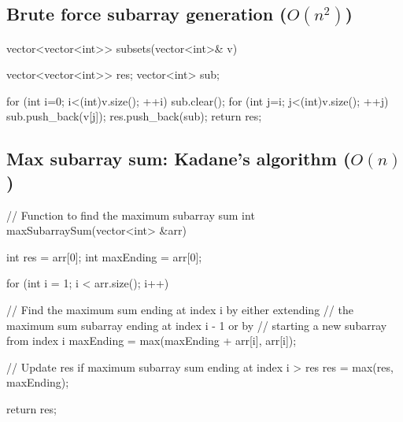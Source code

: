 \documentclass{report}
\begin{document}
\pagebreak 
{}
\bigbreak \noindent 
\subsection{Brute force subarray generation ($O(n^{2})$)}
\bigbreak \noindent 
\begin{cppcode}
    vector<vector<int>> subsets(vector<int>& v) {
        vector<vector<int>> res;
        vector<int> sub;

        for (int i=0; i<(int)v.size(); ++i) {
            sub.clear();
            for (int j=i; j<(int)v.size(); ++j) {
                sub.push_back(v[j]);
                res.push_back(sub);
            }
        }
        return res;
    }
\end{cppcode}
\bigbreak \noindent 
\subsection{Max subarray sum: Kadane's algorithm ($O(n)$)}
\bigbreak \noindent 
\begin{cppcode}
// Function to find the maximum subarray sum
int maxSubarraySum(vector<int> &arr) {
    int res = arr[0];
    int maxEnding = arr[0];

    for (int i = 1; i < arr.size(); i++) {
      
        // Find the maximum sum ending at index i by either extending 
        // the maximum sum subarray ending at index i - 1 or by
        // starting a new subarray from index i
        maxEnding = max(maxEnding + arr[i], arr[i]);
      
        // Update res if maximum subarray sum ending at index i > res
        res = max(res, maxEnding);
    }
    return res;
}
\end{cppcode}

\pagebreak 
{}
\bigbreak \noindent 










\pagebreak 
{}
\bigbreak \noindent 
\end{document}
